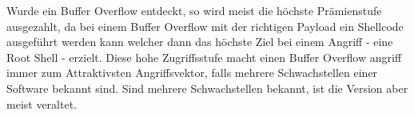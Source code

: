 Wurde ein Buffer Overflow entdeckt, so wird meist die höchste Prämienstufe ausgezahlt, da bei einem
Buffer Overflow mit der richtigen Payload ein Shellcode ausgeführt werden kann welcher dann das
höchste Ziel bei einem Angriff - eine Root Shell - erzielt.
Diese hohe Zugriffsstufe macht einen Buffer Overflow angriff immer zum Attraktivsten Angriffsvektor,
falls mehrere Schwachstellen einer Software bekannt sind. Sind mehrere Schwachstellen bekannt, ist die
Version aber meist veraltet. 




